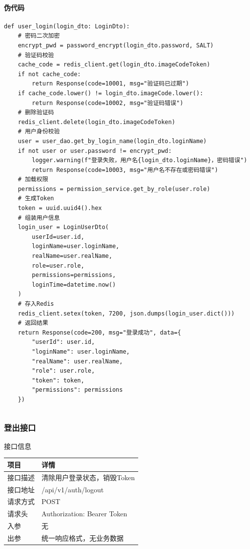\documentclass[12pt, a4paper]{article}
\begin{document}
\newpage
\paragraph{伪代码}
\begin{verbatim}
def user_login(login_dto: LoginDto):
    # 密码二次加密
    encrypt_pwd = password_encrypt(login_dto.password, SALT)
    # 验证码校验
    cache_code = redis_client.get(login_dto.imageCodeToken)
    if not cache_code:
        return Response(code=10001, msg="验证码已过期")
    if cache_code.lower() != login_dto.imageCode.lower():
        return Response(code=10002, msg="验证码错误")
    # 删除验证码
    redis_client.delete(login_dto.imageCodeToken)
    # 用户身份校验
    user = user_dao.get_by_login_name(login_dto.loginName)
    if not user or user.password != encrypt_pwd:
        logger.warning(f"登录失败，用户名{login_dto.loginName}，密码错误")
        return Response(code=10003, msg="用户名不存在或密码错误")
    # 加载权限
    permissions = permission_service.get_by_role(user.role)
    # 生成Token
    token = uuid.uuid4().hex
    # 组装用户信息
    login_user = LoginUserDto(
        userId=user.id,
        loginName=user.loginName,
        realName=user.realName,
        role=user.role,
        permissions=permissions,
        loginTime=datetime.now()
    )
    # 存入Redis
    redis_client.setex(token, 7200, json.dumps(login_user.dict()))
    # 返回结果
    return Response(code=200, msg="登录成功", data={
        "userId": user.id,
        "loginName": user.loginName,
        "realName": user.realName,
        "role": user.role,
        "token": token,
        "permissions": permissions
    })
\end{verbatim}

\begin{table}[H]
    \centering
    \begin{tabular}{|p{14cm}|}
        \hline
        \hline
    \end{tabular}
\end{table}

\subsubsection{登出接口}
\begin{center}
   接口信息
\end{center}

\begin{table}[H]
    \centering
    \begin{tabular}{|l|l|}
        \hline
        项目 & 详情 \\
        \hline
        接口描述 & 清除用户登录状态，销毁Token \\
        \hline
        接口地址 & /api/v1/auth/logout \\
        \hline
        请求方式 & POST \\
        \hline
        请求头 & Authorization: Bearer {Token} \\
        \hline
        入参 & 无 \\
        \hline
        出参 & 统一响应格式，无业务数据 \\
        \hline
    \end{tabular}
\end{table}
\end{document}
